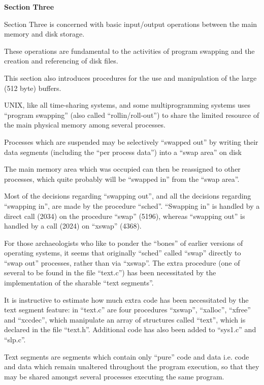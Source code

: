 %
%
{\noindent \Large \bf Section Three}

{\noindent \sf Section Three
is concerned with basic
input/output operations between the
main memory and disk storage.

These operations are fundamental to the
activities of program swapping and the
creation and referencing of disk files.

This section also introduces procedures
for the use and manipulation of the
large (512 byte) buffers.
}


UNIX, like all time-sharing systems,
and some multiprogramming systems uses
``program swapping'' (also called ``rollin/roll-out'')
 to share the limited
resource of the main physical memory
among several processes.

Processes which are suspended may be
selectively ``swapped out'' by writing
their data segments (including the ``per
process data'') into a ``swap area'' on
disk

The main memory area which was occupied
can then be reassigned to other
processes, which quite probably will be
``swapped in'' from the ``swap area''.

Most of the decisions regarding ``swapping out'', and all the decisions
regarding ``swapping in'', are made by
the procedure ``sched''. ``Swapping in'' is
handled by a direct call (2034) on the
procedure ``swap'' (5196), whereas ``swapping out'' is handled by a call (2024)
on ``xswap'' (4368).

For those archaeologists who like to
ponder the ``bones'' of earlier versions
of operating systems, it seems that
originally ``sched'' called ``swap''
directly to ``swap out'' processes,
rather than via ``xswap''. The extra procedure (one of several to be found in
the file ``text.c'') has been necessitated by the implementation of the
sharable ``text segments''.

It is instructive to estimate how much
extra code has been necessitated by the
text segment feature: in ``text.c'' are
four procedures ``xswap'', ``xalloc'',
``xfree'' and ``xccdec'', which manipulate
an array of structures called ``text'',
which is declared in the file ``text.h''.
Additional code has also been added to
``sys1.c'' and ``slp.c''.



Text segments are segments which contain only ``pure'' code and data i.e.
code and data which remain unaltered
throughout the program execution, so
that they may be shared amongst several
processes executing the same program.

